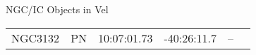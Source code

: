 \begin{block}{NGC/IC Objects in Vel}
  \centering
  \begin{tabularx}{\textwidth}{llrrll} 
    NGC3132 & PN & 10:07:01.73 & -40:26:11.7  & -- \\ 
  \end{tabularx}
\end{block}